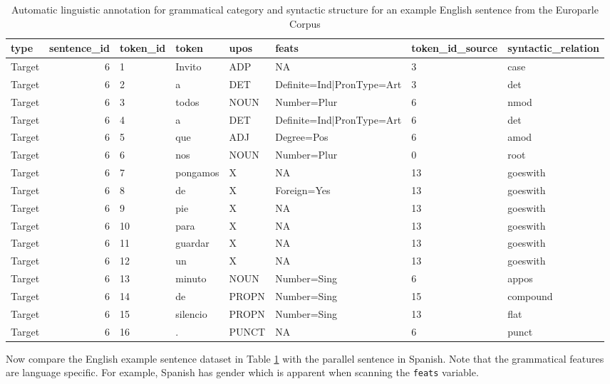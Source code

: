 \documentclass[
]{article}
\begin{document}
\begin{table}

\caption{\label{tab:generation-europarle-en-example}Automatic linguistic annotation for grammatical category and syntactic structure for an example English sentence from the Europarle Corpus}
\centering
\begin{tabular}[t]{lrllllll}
\toprule
type & sentence\_id & token\_id & token & upos & feats & token\_id\_source & syntactic\_relation\\
\midrule
Target & 6 & 1 & Invito & ADP & NA & 3 & case\\
Target & 6 & 2 & a & DET & Definite=Ind|PronType=Art & 3 & det\\
Target & 6 & 3 & todos & NOUN & Number=Plur & 6 & nmod\\
Target & 6 & 4 & a & DET & Definite=Ind|PronType=Art & 6 & det\\
Target & 6 & 5 & que & ADJ & Degree=Pos & 6 & amod\\
\addlinespace
Target & 6 & 6 & nos & NOUN & Number=Plur & 0 & root\\
Target & 6 & 7 & pongamos & X & NA & 13 & goeswith\\
Target & 6 & 8 & de & X & Foreign=Yes & 13 & goeswith\\
Target & 6 & 9 & pie & X & NA & 13 & goeswith\\
Target & 6 & 10 & para & X & NA & 13 & goeswith\\
\addlinespace
Target & 6 & 11 & guardar & X & NA & 13 & goeswith\\
Target & 6 & 12 & un & X & NA & 13 & goeswith\\
Target & 6 & 13 & minuto & NOUN & Number=Sing & 6 & appos\\
Target & 6 & 14 & de & PROPN & Number=Sing & 15 & compound\\
Target & 6 & 15 & silencio & PROPN & Number=Sing & 13 & flat\\
\addlinespace
Target & 6 & 16 & . & PUNCT & NA & 6 & punct\\
\bottomrule
\end{tabular}
\end{table}

Now compare the English example sentence dataset in Table \ref{tab:generation-europarle-en-example} with the parallel sentence in Spanish. Note that the grammatical features are language specific. For example, Spanish has gender which is apparent when scanning the \texttt{feats} variable.
\end{document}
